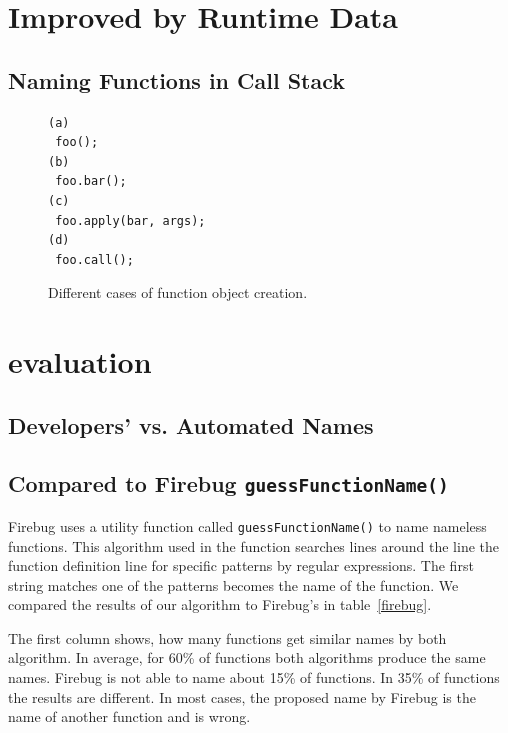 \documentclass{acm_proc_article-sp}
\begin{document}
\section{Improved by Runtime Data}
\subsection{Naming Functions in Call Stack}







\begin{figure}[htp]
\begin{verbatim}
(a)
 foo();
(b)
 foo.bar();
(c)
 foo.apply(bar, args);
(d)
 foo.call();
\end{verbatim}
\caption{Different cases of function object creation.}
\label{fig:functionCall}
\end{figure}



\section{evaluation}

\subsection{Developers' vs. Automated Names}

\subsection{Compared to Firebug {\large \texttt{guessFunctionName()}}}
Firebug uses a utility function called {\small \texttt{guessFunctionName()}} to name nameless functions.
This algorithm used in the function searches lines around the line the function definition line for specific patterns by regular expressions. The
  first string matches one of the patterns becomes the name of the function. We compared the results of our algorithm to Firebug's in table~\ref{firebug}.
  
The first column shows, how many functions get similar names by both algorithm. In average, for 60\% of functions both algorithms produce the same names.
Firebug is not able to name about 15\% of functions. In 35\% of functions the results are different. In most cases, the proposed name by Firebug is the name of another function and is wrong.
  
\end{document}
